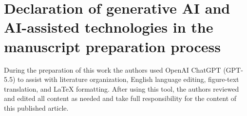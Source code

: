 \documentclass[a4paper,fleqn]{cas-sc}
\begin{document}
\section*{Declaration of generative AI and AI-assisted technologies in the
manuscript preparation process}
During the preparation of this work the authors used OpenAI ChatGPT
(GPT-5.5) to assist with literature organization, English language editing,
figure-text translation, and LaTeX formatting. After using this tool, the
authors reviewed and edited all content as needed and take full responsibility
for the content of this published article.

\printcredits



\end{document}
